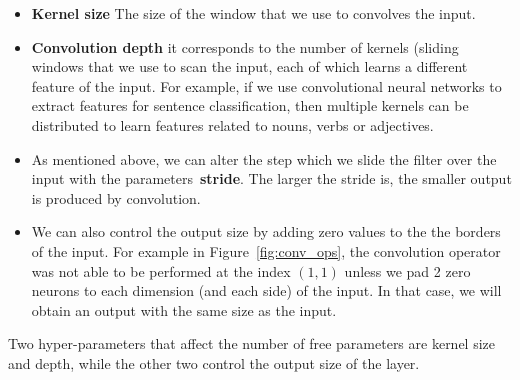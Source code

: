 \begin{itemize}
	\item \textbf{Kernel size} The size of the window that we use to convolves the input. 
	\item \textbf{Convolution depth} it corresponds to the number of kernels (sliding windows that we use to scan the input, each of which learns a different feature of the input. For example, if we use convolutional neural networks to extract features for sentence classification, then multiple kernels can be distributed to learn features related to nouns, verbs or adjectives. 
	\item As mentioned above, we can alter the step which we slide the filter over the input with the parameters~\textbf{stride}. The larger the stride is, the smaller output is produced by convolution.
	\item We can also control the output size by adding zero values to the the borders of the input. For example in Figure~\ref{fig:conv_ops}, the convolution operator was not able to be performed at the index $(1,1)$ unless we pad 2 zero neurons to each dimension (and each side) of the input. In that case, we will obtain an output with the same size as the input.
\end{itemize}

Two hyper-parameters that affect the number of free parameters are kernel size and depth, while the other two control the output size of the layer. 






